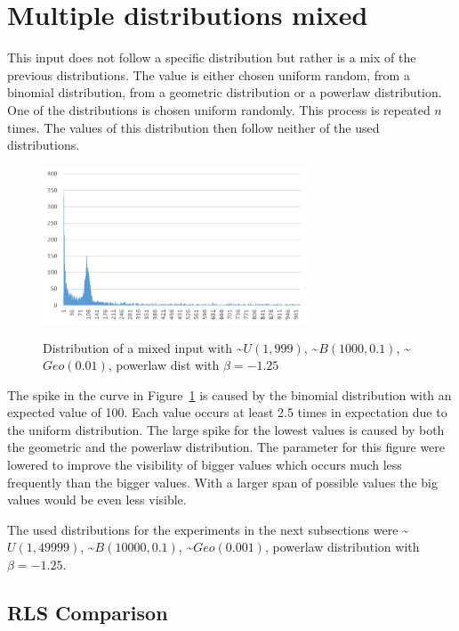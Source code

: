 \section{Multiple distributions mixed}
This input does not follow a specific distribution but rather is a mix of the previous distributions.
The value is either chosen uniform random, from a binomial distribution, from a geometric distribution  or a powerlaw distribution.
One of the distributions is chosen uniform randomly.
This process is repeated $n$ times.
The values of this distribution then follow neither of the used distributions.

\begin{figure}[h]
      \caption{Distribution of a mixed input with \textasciitilde$U(1,999)$, \textasciitilde$B(1000,0.1)$, \textasciitilde$Geo(0.01)$, powerlaw dist with $\beta=-1.25$}
      \centering
      \includegraphics[width=0.7\textwidth]{figures/images/numberGenerator/mixed.png}\label{fig:mixedDistExample}
\end{figure}

The spike in the curve in Figure~\ref{fig:mixedDistExample} is caused by the binomial distribution with an expected value of 100.
Each value occurs at least 2.5 times in expectation due to the uniform distribution.
The large spike for the lowest values is caused by both the geometric and the powerlaw distribution.
The parameter for this figure were lowered to improve the visibility of bigger values which occurs much less frequently than the bigger values.
With a larger span of possible values the big values would be even less visible.

The used distributions for the experiments in the next subsections were \textasciitilde$U(1,49999)$, \textasciitilde$B(10000,0.1)$, \textasciitilde$Geo(0.001)$, powerlaw distribution with $\beta=-1.25$.
\subsection{RLS Comparison}



